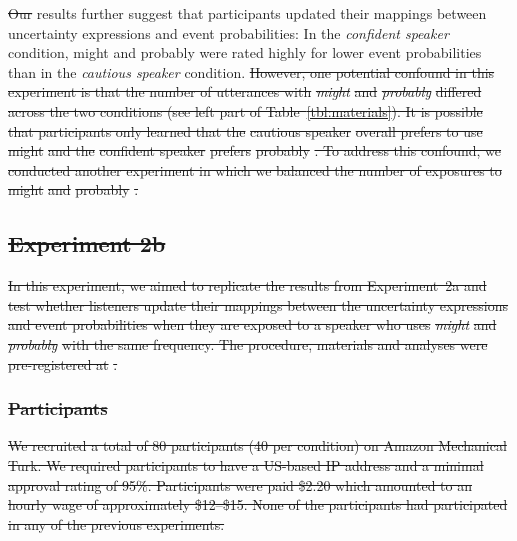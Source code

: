 \documentclass[man, floatsintext]{apa6}
\providecommand{\DIFadd}[1]{{\protect\color{blue}\uwave{#1}}} %
\providecommand{\DIFdel}[1]{{\protect\color{red}\sout{#1}}}                      %
\providecommand{\DIFaddbegin}{} %
\providecommand{\DIFaddend}{} %
\providecommand{\DIFdelbegin}{} %
\providecommand{\DIFdelend}{} %
\newcommand{\DIFscaledelfig}{0.5}
\newlength{\DIFdelgraphicswidth} %
\newlength{\DIFdelgraphicsheight} %
\newcommand{\DIFaddincludegraphics}[2][]{{\color{blue}\fbox{\DIFOincludegraphics[#1]{#2}}}} %
\newcommand{\DIFdelincludegraphics}[2][]{%
\sbox{\DIFdelgraphicsbox}{\DIFOincludegraphics[#1]{#2}}%
\settoboxwidth{\DIFdelgraphicswidth}{\DIFdelgraphicsbox} %
\settoboxtotalheight{\DIFdelgraphicsheight}{\DIFdelgraphicsbox} %
\scalebox{\DIFscaledelfig}{%
\parbox[b]{\DIFdelgraphicswidth}{\usebox{\DIFdelgraphicsbox}\\[-\baselineskip] \rule{\DIFdelgraphicswidth}{0em}}\llap{\resizebox{\DIFdelgraphicswidth}{\DIFdelgraphicsheight}{%
\setlength{\unitlength}{\DIFdelgraphicswidth}%
\begin{picture}(1,1)%
\thicklines\linethickness{2pt} %
{\color[rgb]{1,0,0}\put(0,0){\framebox(1,1){}}}%
{\color[rgb]{1,0,0}\put(0,0){\line( 1,1){1}}}%
{\color[rgb]{1,0,0}\put(0,1){\line(1,-1){1}}}%
\end{picture}%
}\hspace*{3pt}}} %
} %
\DeclareRobustCommand{\DIFaddbegin}{\DIFOaddbegin \let\includegraphics\DIFaddincludegraphics} %
\DeclareRobustCommand{\DIFaddend}{\DIFOaddend \let\includegraphics\DIFOincludegraphics} %
\DeclareRobustCommand{\DIFdelbegin}{\DIFOdelbegin \let\includegraphics\DIFdelincludegraphics} %
\DeclareRobustCommand{\DIFdelend}{\DIFOaddend \let\includegraphics\DIFOincludegraphics} %
\begin{document}
\DIFdelbegin \DIFdel{Our }\DIFdelend \DIFaddbegin \DIFadd{The }\DIFaddend results further suggest that participants updated their mappings between uncertainty expressions and event probabilities: In the {\it confident speaker} condition, {\sc might} and {\sc probably} were rated highly for lower event probabilities than in the {\it cautious speaker} condition. \DIFdelbegin \DIFdel{However, one potential confound in this experiment is that the number of utterances with }\textit{\DIFdel{might}} %
\DIFdel{and }\textit{\DIFdel{probably}} %
\DIFdel{differed across the two conditions (see left part of Table~\ref{tbl:materials}). It is possible that participants only learned that the }%
\DIFdel{cautious speaker}%
\DIFdel{overall prefers to use }%
\DIFdel{might}%
\DIFdel{and the }%
\DIFdel{confident speaker}%
\DIFdel{prefers }%
\DIFdel{probably}%
\DIFdel{. To address this confound, we conducted another experiment in which we balanced the number of exposures to }%
\DIFdel{might}%
\DIFdel{and }%
\DIFdel{probably}%
\DIFdel{.
}%

\subsection{\DIFdel{Experiment 2b}}
\addtocounter{subsection}{-1}%

\DIFdel{In this experiment, we aimed to replicate the results from Experiment~2a and test whether listeners update their 
mappings between the uncertainty expressions and event probabilities when they are exposed to a speaker who
uses }\textit{\DIFdel{might}} %
\DIFdel{and }\textit{\DIFdel{probably}} %
\DIFdel{with the same frequency.  The procedure, materials and analyses were pre-registered at }%
\DIFdel{.
}\subsubsection{\DIFdel{Participants}}
\addtocounter{subsubsection}{-1}%
\DIFdel{We recruited a total of 80 participants (40 per condition) on Amazon Mechanical Turk. 
We required participants to have a US-based IP address and a minimal approval rating 
of 95\%. Participants were paid \$2.20 which amounted to an hourly wage of approximately 
\$12--\$15. None of the participants had participated in any of the previous experiments.
}%
\end{document}
